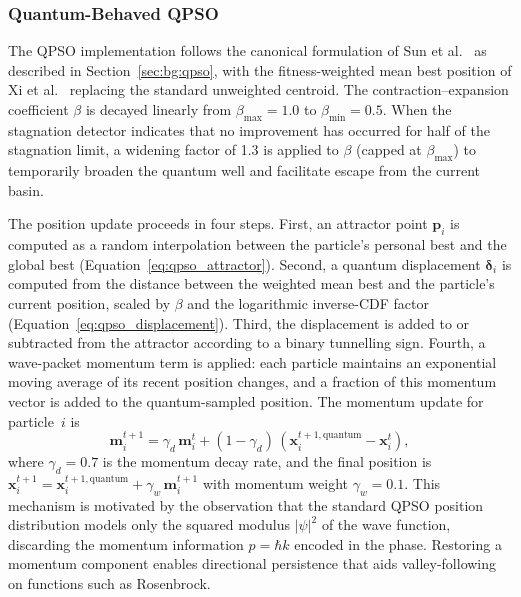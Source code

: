 \subsubsection{Quantum-Behaved QPSO}

The QPSO implementation follows the canonical formulation of Sun et
al.~\cite{Sun2004,Sun2012} as described in
Section~\ref{sec:bg:qpso}, with the fitness-weighted mean best position of Xi
et al.~\cite{Xi2008} replacing the standard unweighted centroid.  The
contraction--expansion coefficient $\beta$ is decayed linearly from
$\beta_{\max} = 1.0$ to $\beta_{\min} = 0.5$.  When the stagnation detector
indicates that no improvement has occurred for half of the stagnation limit, a
widening factor of 1.3 is applied to $\beta$ (capped at $\beta_{\max}$) to
temporarily broaden the quantum well and facilitate escape from the current
basin.

The position update proceeds in four steps.  First, an attractor point
$\mathbf{p}_i$ is computed as a random interpolation between the particle's
personal best and the global best (Equation~\ref{eq:qpso_attractor}).  Second,
a quantum displacement $\boldsymbol{\delta}_i$ is computed from the distance
between the weighted mean best and the particle's current position, scaled by
$\beta$ and the logarithmic inverse-CDF factor
(Equation~\ref{eq:qpso_displacement}).  Third, the displacement is added to or
subtracted from the attractor according to a binary tunnelling sign.  Fourth,
a wave-packet momentum term is applied: each particle maintains an exponential
moving average of its recent position changes, and a fraction of this momentum
vector is added to the quantum-sampled position.  The momentum update for
particle~$i$ is
\begin{equation}
  \mathbf{m}_i^{t+1} = \gamma_d\,\mathbf{m}_i^{t}
    + (1 - \gamma_d)\,(\mathbf{x}_i^{t+1,\text{quantum}} - \mathbf{x}_i^{t}),
  \label{eq:momentum_update}
\end{equation}
where $\gamma_d = 0.7$ is the momentum decay rate, and the final position is
$\mathbf{x}_i^{t+1} = \mathbf{x}_i^{t+1,\text{quantum}}
+ \gamma_w\,\mathbf{m}_i^{t+1}$ with momentum weight $\gamma_w = 0.1$.  This
mechanism is motivated by the observation that the standard QPSO position
distribution models only the squared modulus $|\psi|^2$ of the wave function,
discarding the momentum information $p = \hbar k$ encoded in the phase.
Restoring a momentum component enables directional persistence that aids
valley-following on functions such as Rosenbrock.

